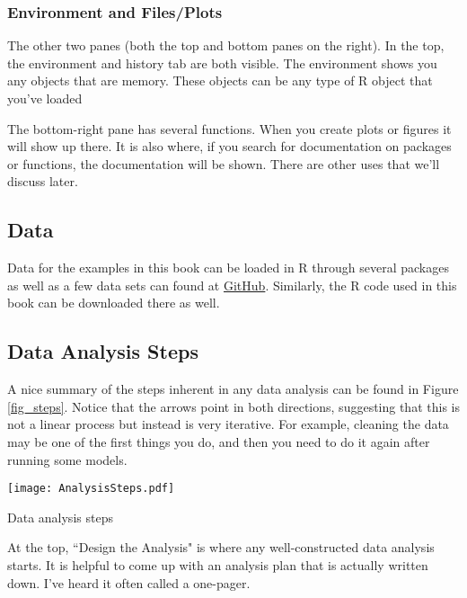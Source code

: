 \documentclass{book}
\begin{document}
\subsubsection*{Environment and Files/Plots}
The other two panes (both the top and bottom panes on the right). In the top, the environment and history tab are both visible. The environment shows you any objects that are memory. These objects can be any type of R object that you've loaded 

The bottom-right pane has several functions. When you create plots or figures it will show up there. It is also where, if you search for documentation on packages or functions, the documentation will be shown. There are other uses that we'll discuss later.


\subsection*{Data}
Data for the examples in this book can be loaded in R through several packages as well as a few data sets can found at \href{github.com/TysonStanley/R_Book}{GitHub}. Similarly, the R code used in this book can be downloaded there as well.


\subsection*{Data Analysis Steps}
A nice summary of the steps inherent in any data analysis can be found in Figure \ref{fig_steps}. Notice that the arrows point in both directions, suggesting that this is not a linear process but instead is very iterative. For example, cleaning the data may be one of the first things you do, and then you need to do it again after running some models.
\begin{marginfigure}
  \texttt{[image: AnalysisSteps.pdf]}
  \caption{Data analysis steps}
  \label{fig_steps}
\end{marginfigure}

At the top, ``Design the Analysis" is where any well-constructed data analysis starts. It is helpful to come up with an analysis plan that is actually written down. I've heard it often called a one-pager. 
\end{document}

